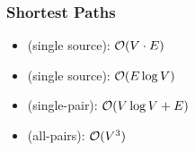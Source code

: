 \documentclass{article}
\begin{document}
\subsubsection{Shortest Paths}
\begin{itemize}
  \item {} (single source): $\mathcal{O}(V\cdot E)$
  \item {} (single source): $\mathcal{O}(E\log V)$
  \item {} (single-pair): $\mathcal{O}(V\log V+E)$
  \item {} (all-pairs): $\mathcal{O}(V^3)$
\end{itemize}
\end{document}
